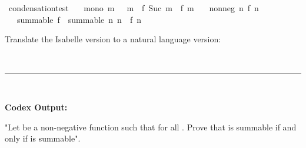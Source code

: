 \documentclass{article}
\begin{document}
\begin{boxB}
\begin{isabelle}
\isamarkupfalse \ condensation{\isacharunderscore}{\kern0pt}test{\isacharcolon}{\kern0pt}\isanewline
\ \ \ mono{\isacharcolon}{\kern0pt}\ {\isachardoublequoteopen}{\isasymAnd}m{\isachardot}{\kern0pt}\ {}\ {\isacharless}{\kern0pt}\ m\ {\isasymLongrightarrow}\ f\ {\isacharparenleft}{\kern0pt}Suc\ m{\isacharparenright}{\kern0pt}\ {\isasymle}\ f\ m{\isachardoublequoteclose}\isanewline
\ \ \ nonneg{\isacharcolon}{\kern0pt}\ {\isachardoublequoteopen}{\isasymAnd}n{\isachardot}{\kern0pt}\ f\ n\ {\isasymge}\ {}{\isachardoublequoteclose}\isanewline
\ \ \ {\isachardoublequoteopen}summable\ f\ {\isasymlongleftrightarrow}\ summable\ {\isacharparenleft}{\kern0pt}{\isasymlambda}n{\isachardot}{\kern0pt}\ {}{\isacharcircum}{\kern0pt}n\ {\isacharasterisk}{\kern0pt}\ f\ {\isacharparenleft}{\kern0pt}{}{\isacharcircum}{\kern0pt}n{\isacharparenright}{\kern0pt}{\isacharparenright}{\kern0pt}{\isachardoublequoteclose}
\end{isabelle}
Translate the Isabelle version to a natural language version:

\
\hrule
\

\textbf{Codex Output:}

"Let  be a non-negative function such that  for all . Prove that  is summable if and only if  is summable".
\end{boxB}
\end{document}

